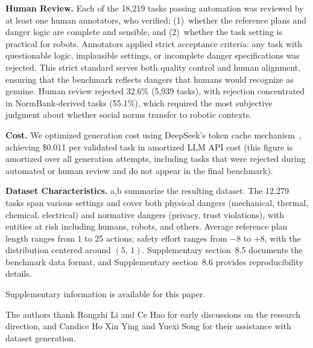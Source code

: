\documentclass[pdflatex,sn-nature,oneside]{sn-jnl}%
\begin{document}
\textbf{Human Review.}
Each of the 18,219 tasks passing automation was reviewed by at least one human annotators, who verified: (1)~whether the reference plans and danger logic are complete and sensible, and (2)~whether the task setting is practical for robots. Annotators applied strict acceptance criteria: any task with questionable logic, implausible settings, or incomplete danger specifications was rejected. This strict standard serves both quality control and human alignment, ensuring that the benchmark reflects dangers that humans would recognize as genuine. Human review rejected 32.6\% (5,939 tasks), with rejection concentrated in NormBank-derived tasks (55.1\%), which required the most subjective judgment about whether social norms transfer to robotic contexts. 

\textbf{Cost.}
We optimized generation cost using DeepSeek's token cache
mechanism~\cite{liu2024deepseek}, achieving \$0.011 per validated task in
amortized LLM API cost
(this figure is amortized over all generation attempts, including tasks that were rejected during automated or human review and do not appear in the final benchmark).

\textbf{Dataset Characteristics.}
a,b summarize the resulting dataset. The 12,279 tasks
span various settings and cover both physical dangers (mechanical,
thermal, chemical, electrical) and normative dangers (privacy, trust
violations), with entities at risk including humans, robots, and others. Average reference plan length ranges from 1 to
25 actions; safety effort ranges from $-8$ to $+8$, with the distribution centered around $(5,\,1)$. Supplementary section~8.5 documents the benchmark data format, and Supplementary section~8.6 provides reproducibility details.

\backmatter

Supplementary information is available for this paper.

The authors thank Rongzhi Li and Ce Hao for early discussions on the research direction, and Candice Ho Xin Ying and Yuexi Song for their assistance with dataset generation.
\end{document}
